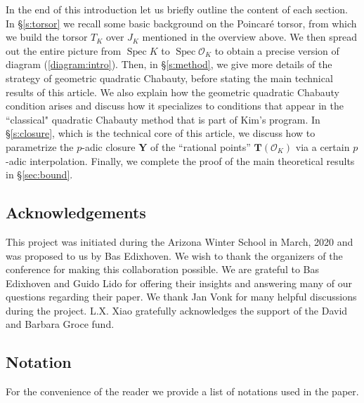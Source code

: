 \documentclass[11pt,oneside]{amsart}
\theoremstyle{plain}
\theoremstyle{definition}
\DeclareMathOperator{\spec}{Spec} \DeclareMathOperator{\sgn}{sign}
\def\TT{\mathbf{T}}
\def\Y{\mathbf{Y}}
\def\oh{\mathcal{O}}
\begin{document}
In the end of this introduction let us briefly outline the content of each section. In \S \ref{s:torsor} we recall some basic background on the Poincar\'e torsor, from which we build the torsor $T_K$ over $J_K$ mentioned in the overview above. We then spread out the entire picture from $\spec K$ to $\spec \oh_K$ to obtain a precise version of diagram (\ref{diagram:intro}). Then, in \S \ref{s:method}, we give more details of the strategy of geometric quadratic Chabauty, before stating the main technical results of this article. We also explain how the geometric quadratic Chabauty condition arises and discuss how it specializes to conditions that appear in the ``classical" quadratic Chabauty method that is part of Kim's program. In \S \ref{s:closure}, which is the technical core of this article, we discuss how to parametrize the $p$-adic closure $\Y$ of the ``rational points'' $\TT(\oh_K)$ via a certain $p$-adic interpolation. Finally, we complete the proof of the main theoretical results in \S \ref{sec:bound}.  



\subsection*{Acknowledgements}

This project was initiated during the Arizona Winter School in March, 2020 and was proposed to us by Bas Edixhoven. We wish to thank the organizers of the conference for making this collaboration possible. We are grateful to Bas Edixhoven and Guido Lido for offering their insights and answering many of our questions regarding their paper. We thank Jan Vonk for many helpful discussions during the project. L.X. Xiao gratefully acknowledges the support of the David and Barbara Groce fund.  



\subsection*{Notation} \label{ss:notation}

For the convenience of the reader we provide a list of notations used in the paper.
\end{document}
